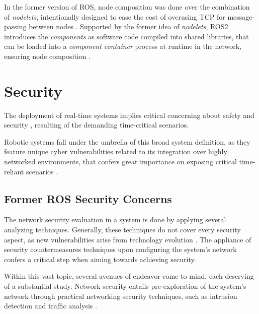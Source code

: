 In the former version of ROS, node composition was done over the combination of \textit{nodelets}, intentionally designed to ease the cost of overusing TCP for message-passing between nodes \cite{ros-nodelets}.  Supported by the former idea of \textit{nodelets}, ROS2 introduces the \textit{components} as software code compiled into shared libraries, that can be loaded into a \textit{component container} process at runtime in the network, ensuring node composition \cite{ros2documentation}. 

           

\section{Security}

The deployment of real-time systems implies critical concerning about safety and security \cite{maruyama2016exploring}, resulting of the demanding time-critical scenarios. 

Robotic systems fall under the umbrella of this broad system definition, as they feature unique cyber vulnerabilities related to its integration over highly networked environments, that confers great importance on exposing critical time-reliant scenarios \cite{mcclean2013preliminary, dieber2017security}.

\subsection{Former ROS Security Concerns}

The network security evaluation in a system is done by applying several analyzing techniques. Generally, these techniques do not cover every security aspect, as new vulnerabilities arise from technology evolution \cite{kaeo2004designing}.
The appliance of security countermeasures techniques upon configuring the system's network confers a critical step when aiming towards achieving security.

Within this vast topic, several avenues of endeavor come to mind, each deserving of a substantial study. Network security entails pre-exploration of the system's network through practical networking security techniques, such as intrusion detection and traffic analysis \cite{marin2005network}.

